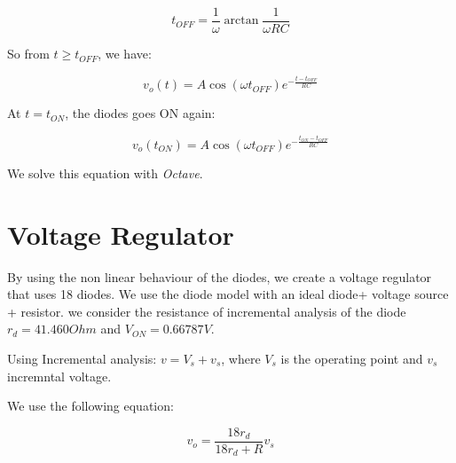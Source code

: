 \begin{equation}
  t_{OFF} = \frac{1}{\omega}\arctan\frac{1}{\omega RC}
\end{equation}

So from $t \geq t_{OFF}$, we have:

\begin{equation}
  v_o(t) = A\cos(\omega t_{OFF}) e^{-\frac{t-t_{OFF}}{RC}}
\end{equation}

At $t = t_{ON}$, the diodes goes ON again:

\begin{equation}
  v_o(t_{ON}) = A\cos(\omega t_{OFF}) e^{-\frac{t_{ON}-t_{OFF}}{RC}}
\end{equation}

We solve this equation with \textit{Octave}.


\section{Voltage Regulator}

By using the non linear behaviour of the diodes, we create a voltage regulator that uses 18 diodes.
We use the diode model with an ideal diode+ voltage source + resistor. we consider the resistance of incremental analysis of the diode
$r_d = 41.460 Ohm$ and $V_{ON} = 0.66787 V$.

Using Incremental analysis: $v = V_s + v_s$, where $V_s$ is the operating point and $v_s$ incremntal voltage.

We use the following equation:

\begin{equation}
  v_o = \frac{18 r_d}{18 r_d + R} v_s
\end{equation}






